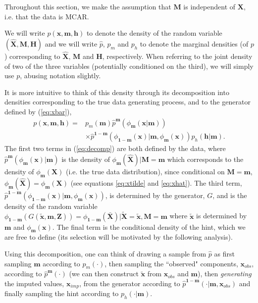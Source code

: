 \documentclass{article}
\begin{document}
Throughout this section, we make the assumption that $\mathbf{M}$ is independent of $\mathbf{X}$, i.e. that the data is MCAR.

We will write $p(\mathbf{x}, \mathbf{m}, \mathbf{h})$ to denote the density of the random variable $(\hat{\mathbf{X}}, \mathbf{M}, \mathbf{H})$ and we will write $\hat{p}$, $p_m$ and $p_h$ to denote the marginal densities (of $p$) corresponding to $\hat{\mathbf{X}}$, $\mathbf{M}$ and $\mathbf{H}$, respectively. When referring to the joint density of two of the three variables (potentially conditioned on the third), we will simply use $p$, abusing notation slightly.

It is more intuitive to think of this density through its decomposition into densities corresponding to the true data generating process, and to the generator defined by (\ref{eq:xbar}),
\begin{align} \label{eq:decomp}
p(\mathbf{x}, \mathbf{m}, \mathbf{h}) =& p_m(\mathbf{m})\hat{p}^{\mathbf{m}}(\phi_{\mathbf{m}}(\mathbf{x} | \mathbf{m}))\\\nonumber
&\times \hat{p}^{\mathbf{1 - m}}(\phi_{\mathbf{1 - m}}(\mathbf{x}) | \mathbf{m}, \phi_{\mathbf{m}}(\mathbf{x}))p_h(\mathbf{h} | \mathbf{m}).
\end{align}
The first two terms in (\ref{eq:decomp}) are both defined by the data, where $\hat{p}^{\mathbf{m}}(\phi_{\mathbf{m}}(\mathbf{x}) | \mathbf{m})$ is the density of $\phi_{\mathbf{m}}(\hat{\mathbf{X}}) | \mathbf{M} = \mathbf{m}$ which corresponds to the density of $\phi_{\mathbf{m}}(\mathbf{X})$ (i.e. the true data distribution), since conditional on $\mathbf{M} = \mathbf{m}$, $\phi_{\mathbf{m}}(\hat{\mathbf{X}}) = \phi_{\mathbf{m}}(\mathbf{X})$ (see equations \ref{eq:xtilde} and \ref{eq:xhat}). The third term, $\hat{p}^{\mathbf{1 - m}}(\phi_{\mathbf{1 - m}}(\mathbf{x}) | \mathbf{m}, \phi_{\mathbf{m}}(\mathbf{x}))$, is determined by the generator, $G$, and is the density of the random variable $\phi_{\mathbf{1 - m}}(G(\tilde{\mathbf{x}}, \mathbf{m}, \mathbf{Z})) = \phi_{\mathbf{1 - m}}(\bar{\mathbf{X}}) | \tilde{\mathbf{X}} = \tilde{\mathbf{x}}, \mathbf{M} = \mathbf{m}$ where $\tilde{\mathbf{x}}$ is determined by $\mathbf{m}$ and $\phi_{\mathbf{m}}(\mathbf{x})$. The final term is the conditional density of the hint, which we are free to define (its selection will be motivated by the following analysis).

Using this decomposition, one can think of drawing a sample from $\hat{p}$ as first sampling $\mathbf{m}$ according to $p_m(\cdot)$, then sampling the ``observed" components, $\mathbf{x}_{obs}$, according to $\hat{p}^{\mathbf{m}}(\cdot)$ (we can then construct $\tilde{\mathbf{x}}$ from $\mathbf{x}_{obs}$ and $\mathbf{m}$), then {\em generating} the imputed values, $\mathbf{x}_{imp}$, from the generator according to $\hat{p}^{\mathbf{1 - m}}(\cdot | \mathbf{m}, \mathbf{x}_{obs})$ and finally sampling the hint according to $p_h(\cdot |\mathbf{m})$.
\end{document}
